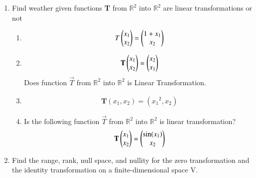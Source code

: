 \renewcommand{\theequation}{\theenumi}
\renewcommand{\thefigure}{\theenumi}
\begin{enumerate}[label=\thesubsection.\arabic*.,ref=\thesubsection.\theenumi]
%
\item  Find weather given  functions \textbf{T} from $\mathbb{R}^2$ into $\mathbb{R}^2$ are linear transformations or not

\begin{enumerate}
\item 
\begin{align}
    T\begin{pmatrix}x_1\\x_2\end{pmatrix}=\begin{pmatrix}1+x_1\\x_2\end{pmatrix}
\label{eq:solutions/3/1/1/a/1}
\end{align}
\solution

%
\item \begin{align}
\mathbf{T}\begin{pmatrix}x_1\\x_2\end{pmatrix}= \begin{pmatrix}x_2\\ x_1\end{pmatrix} \label{eq:solutions/3/1/1/b/0}
\end{align}
Does function $\vec{T}$ from $\mathbb{R}^2$ into $\mathbb{R}^2$ is Linear Transformation.

\solution

%
\item 
\begin{align}
	\textbf{T}(x_1,x_2) = ({x_1}^2,x_2)
\end{align}

\solution

%
\item Is the following function $\vec{T}$ from $\mathbb{R}^2$ into $\mathbb{R}^2$  is linear transformation?
\begin{align}
\mathbf{T} 
\begin{pmatrix}
x_1\\
x_2\end{pmatrix}
= 
\begin{pmatrix}\sin (x_1)\\x_2\end{pmatrix} \nonumber\end{align}
%
%
\solution

%
\end{enumerate}
%
\item Find the range, rank, null space, and nullity for the zero transformation and the identity transformation on a finite-dimensional space V. 
%
\\
\solution



\end{enumerate}
